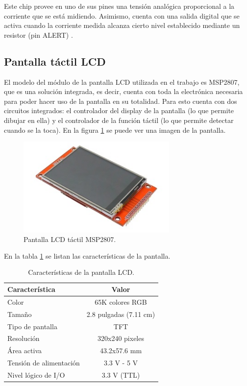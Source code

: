 Este chip provee en uno de sus pines una tensión analógica proporcional a la corriente que se está midiendo. Asimismo, cuenta con una salida digital que se activa cuando la corriente medida alcanza cierto nivel establecido mediante un resistor (pin ALERT) \citep{INA301}.

\subsection{Pantalla táctil LCD}

El modelo del módulo de la pantalla LCD utilizada en el trabajo es MSP2807, que es una solución integrada, es decir, cuenta con toda la electrónica necesaria para poder hacer uso de la pantalla en su totalidad. Para esto cuenta con dos circuitos integrados: el controlador del display de la pantalla (lo que permite dibujar en ella) y el controlador de la función táctil (lo que permite detectar cuando se la toca). En la figura \ref{fig:pantLCD} se puede ver una imagen de la pantalla.

\begin{figure}[H]
\centering
\includegraphics[width=0.7\textwidth]{./Figures/pant_LCD.png}
\caption{Pantalla LCD táctil MSP2807.}
\label{fig:pantLCD}
\end{figure}

En la tabla \ref{tab:caractLCD} se listan las características de la pantalla.

\begin{table}[H]
	\centering
	\caption{Características de la pantalla LCD.}
	\begin{tabular}{l c}
		\toprule
		\textbf{Característica}	& \textbf{Valor} \\
		\midrule
		Color				& 65K colores RGB \\
		Tamaño				& 2.8 pulgadas (7.11 cm) \\
		Tipo de pantalla	& TFT \\
		Resolución			& 320x240 pixeles \\
		Área activa			& 43.2x57.6 mm \\
		Tensión de alimentación		& 3.3 V - 5 V \\
		Nivel lógico de I/O			& 3.3 V (TTL) \\		
		\bottomrule
		\hline
	\end{tabular}
	\label{tab:caractLCD}
\end{table}

